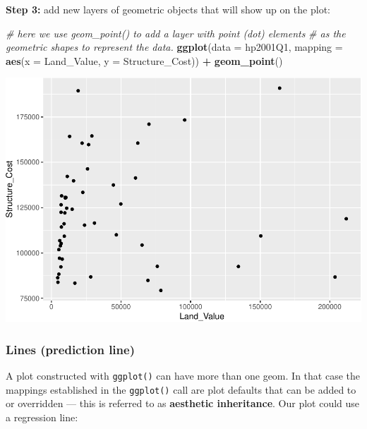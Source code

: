 \documentclass[
]{book}
\newenvironment{Shaded}{\begin{snugshade}}{\end{snugshade}}
\newcommand{\CommentTok}[1]{\textcolor[rgb]{0.56,0.35,0.01}{\textit{#1}}}
\newcommand{\DataTypeTok}[1]{\textcolor[rgb]{0.13,0.29,0.53}{#1}}
\newcommand{\KeywordTok}[1]{\textcolor[rgb]{0.13,0.29,0.53}{\textbf{#1}}}
\newcommand{\NormalTok}[1]{#1}
\newcommand{\OperatorTok}[1]{\textcolor[rgb]{0.81,0.36,0.00}{\textbf{#1}}}
\newcommand{\StringTok}[1]{\textcolor[rgb]{0.31,0.60,0.02}{#1}}
\begin{document}
\textbf{Step 3:} add new layers of geometric objects that will show up on the plot:

\begin{Shaded}
\begin{Highlighting}[]
\CommentTok{\# here we use geom\_point() to add a layer with point (dot) elements }
\CommentTok{\# as the geometric shapes to represent the data.}
\KeywordTok{ggplot}\NormalTok{(}\DataTypeTok{data =}\NormalTok{ hp2001Q1, }\DataTypeTok{mapping =} \KeywordTok{aes}\NormalTok{(}\DataTypeTok{x =}\NormalTok{ Land\_Value, }\DataTypeTok{y =}\NormalTok{ Structure\_Cost)) }\OperatorTok{+}
\StringTok{  }\KeywordTok{geom\_point}\NormalTok{()}
\end{Highlighting}
\end{Shaded}

\includegraphics{R/Rgraphics/figures/unnamed-chunk-144-1.pdf}

\hypertarget{lines-prediction-line}{%
\subsubsection{Lines (prediction line)}\label{lines-prediction-line}}

A plot constructed with \texttt{ggplot()} can have more than one geom. In that case the mappings established in the \texttt{ggplot()} call are plot defaults that can be added to or overridden --- this is referred to as \textbf{aesthetic inheritance}. Our plot could use a regression line:
\end{document}

